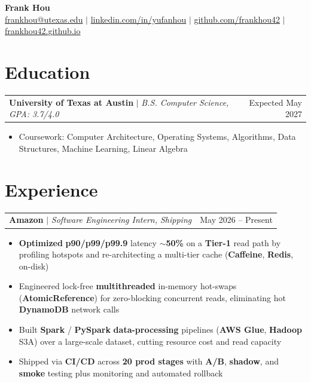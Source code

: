 \documentclass[letterpaper,10pt]{article}
\makeatletter
\newcommand{\resumeWorkHeading}[2]{%
  \vspace{2pt}\noindent
  \begin{tabular*}{\textwidth}{@{}l@{\extracolsep{\fill}}r@{}}
    #1 & #2 \\
  \end{tabular*}%
  \vspace{-2pt}
}
\newcommand{\resumeItemListStart}{\begin{itemize}}
\newcommand{\resumeItemListEnd}{\end{itemize}\vspace{3pt}}
\newcommand{\resumeItem}[1]{\item #1}
\makeatother
\begin{document}
\begin{center}
  {\huge \textbf{Frank Hou}} \\[2pt]
  \small
  \href{mailto:frankhou@utexas.edu}{frankhou@utexas.edu} $|$
  \href{https://linkedin.com/in/yufanhou}{linkedin.com/in/yufanhou} $|$
  \href{https://github.com/frankhou42}{github.com/frankhou42} $|$
  \href{https://frankhou42.github.io/}{frankhou42.github.io}
\end{center}
\vspace{-4pt}

\section{Education}
\resumeWorkHeading
{\textbf{University of Texas at Austin} $|$ \emph{B.S. Computer Science, GPA: 3.7/4.0}}{Expected May 2027}
\resumeItemListStart
\resumeItem{Coursework: Computer Architecture, Operating Systems, Algorithms, Data Structures, Machine Learning, Linear Algebra}
\resumeItemListEnd

\section{Experience}
\resumeWorkHeading
{\textbf{Amazon} $|$ \emph{Software Engineering Intern, Shipping}}{May 2026 -- Present}
\resumeItemListStart
\resumeItem{\textbf{Optimized} \textbf{p90/p99/p99.9} latency \textbf{$\sim$50\%} on a \textbf{Tier-1} read path by profiling hotspots and re-architecting a multi-tier cache (\textbf{Caffeine}, \textbf{Redis}, on-disk)}
\resumeItem{Engineered lock-free \textbf{multithreaded} in-memory hot-swaps (\textbf{AtomicReference}) for zero-blocking concurrent reads, eliminating hot \textbf{DynamoDB} network calls}
\resumeItem{Built \textbf{Spark} / \textbf{PySpark} \textbf{data-processing} pipelines (\textbf{AWS Glue}, \textbf{Hadoop} S3A) over a large-scale dataset, cutting resource cost and read capacity}
\resumeItem{Shipped via \textbf{CI/CD} across \textbf{20 prod stages} with \textbf{A/B}, \textbf{shadow}, and \textbf{smoke} testing plus monitoring and automated rollback}
\resumeItemListEnd
\end{document}
